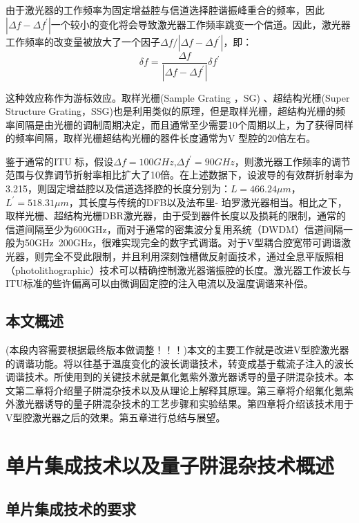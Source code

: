 \documentclass{ZJUthesis}
\begin{document}
由于激光器的工作频率为固定增益腔与信道选择腔谐振峰重合的频率，因此$|\Delta f-\Delta f^\prime|$一个较小的变化将会导致激光器工作频率跳变一个信道。因此，激光器工作频率的改变量被放大了一个因子$\Delta f/|\Delta f-\Delta f^\prime|$，即：
\begin{equation}
  \delta f = \frac{\Delta f}{|\Delta f-\Delta f^\prime|} \delta f^\prime
\end{equation}

这种效应称作为游标效应。取样光栅(Sample Grating ，SG) 、超结构光栅(Super Structure Grating，SSG)也是利用类似的原理，但是取样光栅，超结构光栅的频率间隔是由光栅的调制周期决定，而且通常至少需要10个周期以上，为了获得同样的频率间隔，取样光栅超结构光栅的器件长度通常为V 型腔的20倍左右。

鉴于通常的ITU 标，假设$\Delta f=100GHz$,$\Delta f^\prime=90GHz$，则激光器工作频率的调节范围与仅靠调节折射率相比扩大了10倍。在上述数据下，设波导的有效群折射率为3.215，则固定增益腔以及信道选择腔的长度分别为：$L=466.24\mu m$，$L^\prime=518.31\mu m$，其长度与传统的DFB以及法布里- 珀罗激光器相当。相比之下，取样光栅、超结构光栅DBR激光器，由于受到器件长度以及损耗的限制，通常的信道间隔至少为600GHz，而对于通常的密集波分复用系统（DWDM）信道间隔一般为50GHz~200GHz，很难实现完全的数字式调谐。对于V型耦合腔宽带可调谐激光器，则完全不受此限制，并且利用深刻蚀槽做反射面技术，通过全息平版照相（photolithographic）技术可以精确控制激光器谐振腔的长度。激光器工作波长与ITU标准的些许偏离可以由微调固定腔的注入电流以及温度调谐来补偿。

\section{本文概述}

(本段内容需要根据最终版本做调整！！！)本文的主要工作就是改进V型腔激光器的调谐功能。将以往基于温度变化的波长调谐技术，转变成基于载流子注入的波长调谐技术。所使用到的关键技术就是氟化氪紫外激光器诱导的量子阱混杂技术。本文第二章将介绍量子阱混杂技术以及从理论上解释其原理。第三章将介绍氟化氪紫外激光器诱导的量子阱混杂技术的工艺步骤和实验结果。第四章将介绍该技术用于V型腔激光器之后的效果。第五章进行总结与展望。

\chapter{单片集成技术以及量子阱混杂技术概述}

\section{单片集成技术的要求}
\end{document}
